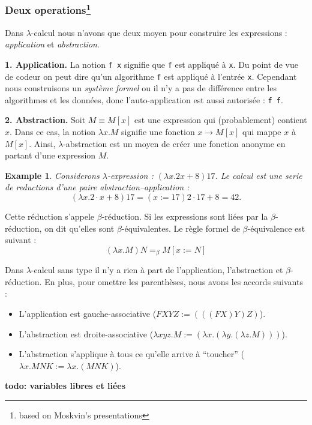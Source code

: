 \documentclass[12pt, a4paper]{article}
\newtheorem*{example}{Example}
\begin{document}
\subsubsection*{Deux operations\footnote{based on Moskvin's presentations}}
Dans $\lambda$-calcul nous n'avons que deux moyen pour construire les expressions : \emph{application} et \emph{abstraction}.

\textbf{1. Application.} La notion \verb|f x| signifie que \verb|f| est appliqué à \verb|x|. Du point de vue de codeur on peut dire qu'un algorithme \verb|f| est appliqué à l'entrée \verb|x|. Cependant nous construisons un \emph{système formel} ou il n'y a pas de différence entre les algorithmes et les données, donc l'auto-application est aussi autorisée : \verb|f f|.

\textbf{2. Abstraction.} Soit $M \equiv M[x]$ est une expression qui (probablement) contient $x$. Dans ce cas, la notion $\lambda x.M$ signifie une fonction $x \to M[x]$ qui mappe $x$ à $M[x]$.
Ainsi, $\lambda$-abstraction est un moyen de créer une fonction anonyme en partant d'une expression $M$.
\begin{example}
	Considerons $\lambda$-expression : $(\lambda x.2x + 8)17$.
	Le calcul est une serie de reductions d'une paire abstraction--application :
	$$(\lambda x.2 \cdot x + 8)17 =(x:=17) 2 \cdot 17 + 8 = 42.$$
\end{example}
Cette réduction s'appele $\beta$-réduction.
Si les expressions sont liées par la $\beta$-réduction, on dit qu'elles sont $\beta$-équivalentes.
Le règle formel de $\beta$-équivalence est suivant :
$$(\lambda x.M)N =_\beta M[x:=N]$$

Dans $\lambda$-calcul sans type il n'y a rien à part de l'application, l'abstraction et $\beta$-réduction.
En plus, pour omettre les parenthèses, nous avons les accords suivants :
\begin{itemize}
	\item L'application est gauche-associative ($F X Y Z := (((F X) Y) Z)$).
	\item L'abstraction est droite-associative ($\lambda x y z.M := (\lambda x.(\lambda y.(\lambda z.M)))$).
	\item L'abstraction s'applique à tous ce qu'elle arrive à ``toucher'' ($\lambda x. M N K := \lambda x.(MNK)$).
\end{itemize}
\textbf{todo: variables libres et liées}
\end{document}
